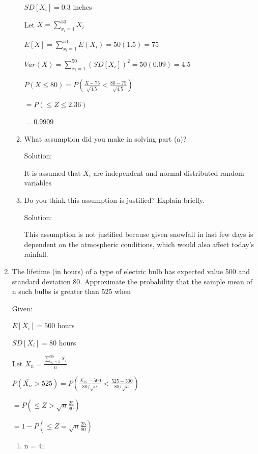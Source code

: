 \documentclass{article}
\begin{document}
\begin{enumerate}
\begin{enumerate}
        $SD[X_i] = 0.3$ inches

        Let $X = \displaystyle \sum_{x_i = 1}^{50} {X_i} $

        $E[X] = \displaystyle \sum_{x_i = 1}^{50} {E(X_i)} = 50(1.5) = 75$

        $Var(X) = \displaystyle \sum_{x_i = 1}^{50} {(SD[X_i])^2 = 50(0.09) = 4.5}$
    
        $\displaystyle P(X \leq 80) = P\left(\frac{X - 75}{\sqrt{4.5}}<\frac{80 - 75}{\sqrt{4.5}}\right)$

        $= \displaystyle P\left(\leq Z \leq 2.36 \right)$
    
        $=0.9909$
        \item What assumption did you make in solving part (a)?
        
        Solution:

        It is assumed that $X_i$ are independent and normal distributed random variables
        
        \item Do you think this assumption is justified? Explain briefly.
        
        Solution:

        This assumption is not justified because given snowfall in last few days is dependent on the atmospheric conditions, which would also affect today's rainfall.
    \end{enumerate}
    \item  The lifetime (in hours) of a type of electric bulb has expected value 500 and standard deviation 80. 
    Approximate the probability that the sample mean of n such bulbs is greater than 525 when
       
    Given:

        $E[X_i] = 500$ hours

        $SD[X_i] = 80$ hours

        Let $\bar{X_n} = \displaystyle \frac{\sum_{x_i = 1}^{50} {X_i}}{n}$
    
        $\displaystyle P(\bar{X_n} > 525) = P\left(\frac{\bar{X_{25}} - 500}{80/\sqrt{n}}<\frac{525 - 500}{80/\sqrt{n}}\right)$

        $= \displaystyle P\left(\leq Z > \sqrt{n}\frac{25}{80}\right)$
    
        $=1 - P\left(\leq Z = \sqrt{n}\frac{25}{80}\right)$

    \begin{enumerate}
        \item n = 4;


\end{enumerate}
\end{enumerate}
\end{document}
